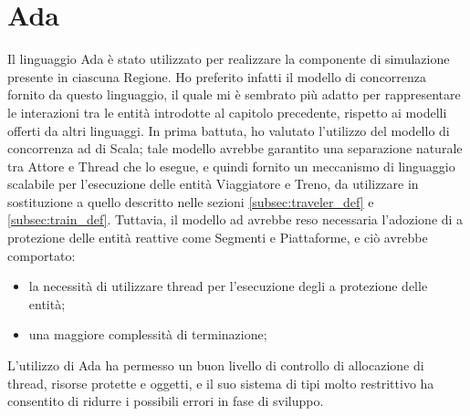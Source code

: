 	\section{Ada}
		Il linguaggio Ada è stato utilizzato per realizzare la componente di simulazione presente in ciascuna Regione. Ho preferito infatti il modello di concorrenza fornito da questo linguaggio, il quale mi è sembrato più adatto per rappresentare le interazioni tra le entità introdotte al capitolo precedente, rispetto ai modelli offerti da altri linguaggi. 
		In prima battuta, ho valutato l'utilizzo del modello di concorrenza ad  di Scala; tale modello avrebbe garantito una separazione naturale tra Attore e Thread che lo esegue, e quindi fornito un meccanismo di linguaggio scalabile per l'esecuzione delle entità Viaggiatore e Treno, da utilizzare in sostituzione a quello descritto nelle sezioni \ref{subsec:traveler_def} e \ref{subsec:train_def}. Tuttavia, il modello ad  avrebbe reso necessaria l'adozione di  a protezione delle entità reattive come Segmenti e Piattaforme, e ciò avrebbe comportato:
			\begin{itemize}
				\item la necessità di utilizzare thread per l'esecuzione degli  a protezione delle entità;
				\item una maggiore complessità di terminazione;
			\end{itemize}
		L'utilizzo di Ada ha permesso un buon livello di controllo di allocazione di thread, risorse protette e oggetti, e il suo sistema di tipi molto restrittivo ha consentito di ridurre i possibili errori in fase di sviluppo.
	
